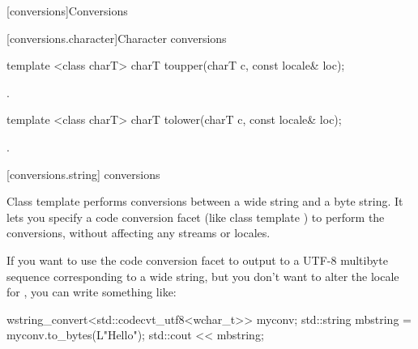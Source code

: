 [conversions]{Conversions}

[conversions.character]{Character conversions}

%
\begin{itemdecl}
template <class charT> charT toupper(charT c, const locale& loc);
\end{itemdecl}

\begin{itemdescr}
\pnum
\returns
{}.
\end{itemdescr}

%
\begin{itemdecl}
template <class charT> charT tolower(charT c, const locale& loc);
\end{itemdecl}

\begin{itemdescr}
\pnum
\returns
{}.
\end{itemdescr}

[conversions.string]{ conversions}

\pnum
Class template  performs conversions between a wide
string and a byte string. It lets you specify a code conversion facet
(like class template ) to perform the conversions, without
affecting any streams or locales. \begin{example} If you want to use the code
conversion facet  to output to  a UTF-8
multibyte sequence corresponding to a wide string, but you don't want to
alter the locale for , you can write something like:

\begin{codeblock}
wstring_convert<std::codecvt_utf8<wchar_t>> myconv;
std::string mbstring = myconv.to_bytes(L"Hello\n");
std::cout << mbstring;
\end{codeblock}
\end{example}

\pnum
{}

